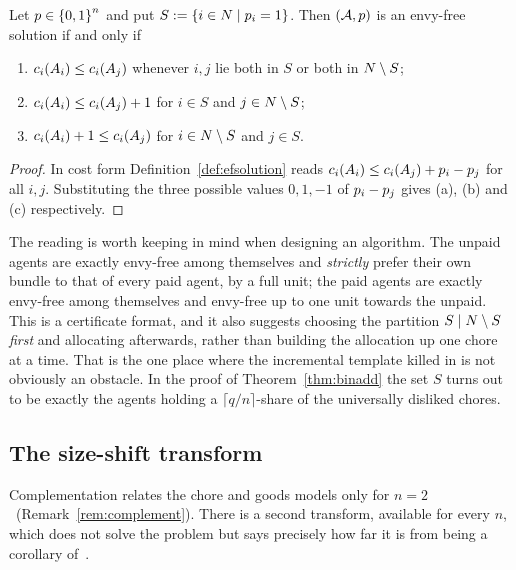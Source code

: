 \begin{proposition}
\label{prop:twotier}
Let $p \in \left\{0,1\right\}^n$ and put $S := \left\{i \in N \mid p_i = 1\right\}$.
Then $(\mathcal{A},p)$ is an envy-free solution if and only if
\begin{enumerate}
  \item[(a)] $c_i(A_{i}) \le c_i(A_{j})$ whenever $i,j$ lie
    both in $S$ or both in $N \setminus S$;
  \item[(b)] $c_i(A_{i}) \le c_i(A_{j}) + 1$ for $i \in S$ and
    $j \in N \setminus S$;
  \item[(c)] $c_i(A_{i}) + 1 \le c_i(A_{j})$ for
    $i \in N \setminus S$ and $j \in S$.
\end{enumerate}
\end{proposition}

\begin{proof}
In cost form Definition~\ref{def:efsolution} reads
$c_i(A_{i}) \le c_i(A_{j}) + p_i - p_j$ for all
$i,j$. Substituting the three possible values $0, 1, -1$ of
$p_i - p_j$ gives (a), (b) and (c) respectively.
\end{proof}

The reading is worth keeping in mind when designing an algorithm. The unpaid
agents are exactly envy-free among themselves and \emph{strictly} prefer their
own bundle to that of every paid agent, by a full unit; the paid agents are
exactly envy-free among themselves and envy-free up to one unit towards the
unpaid. This is a certificate format, and it also suggests choosing the
partition $S \mid N \setminus S$ \emph{first} and allocating afterwards,
rather than building the allocation up one chore at a time.
\ifworking
That is the one place where the incremental template killed in
 is not obviously an obstacle. In the proof of
Theorem~\ref{thm:binadd} the set $S$ turns out to be exactly the agents holding
a $\lceil q/n \rceil$-share of the universally disliked chores.
\fi

\subsection{The size-shift transform}
\label{sec:sizeshift}

Complementation relates the chore and goods models only for
$n = 2$\ifworking\ (Remark~\ref{rem:complement})\fi. There is a second transform,
available for every $n$, which does not solve the problem but says precisely how
far it is from being a corollary of~\cite{BKNS22}.

